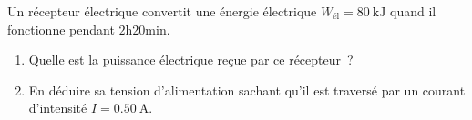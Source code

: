 Un récepteur électrique convertit une énergie électrique
$W_{\text{él}}=\qty{80}{\kJ}$ quand il fonctionne pendant $\mathrm{2h20min}$.
\begin{enumerate}
    \item Quelle est la puissance électrique reçue par ce récepteur~?
    \item En déduire sa tension d'alimentation sachant qu'il est traversé par un
          courant d'intensité $I=\qty{0.50}{\A}$.
\end{enumerate}
